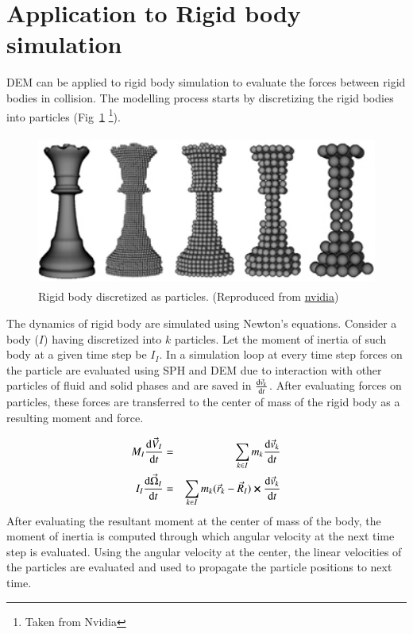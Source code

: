 \section{Application to Rigid body simulation}
\label{sec:appl-rigid-body}

DEM can be applied to rigid body simulation to evaluate the forces between rigid
bodies in collision. The modelling process starts by discretizing the rigid
bodies into particles (Fig~\ref{fig:rigid_body_particles} \footnote{Taken from Nvidia}).


\begin{figure}
  \centering
  \includegraphics[width=0.9\linewidth, height=5cm]{dem/doc_images/grid_to_particles}
  \caption{Rigid body discretized as particles. (Reproduced from
    \href{https://developer.nvidia.com/gpugems/GPUGems3/gpugems3_ch29.html}{nvidia})}
  \label{fig:rigid_body_particles}
\end{figure}


The dynamics of rigid body are simulated using Newton's equations. Consider a
body ($I$) having discretized into $k$ particles. Let the moment of inertia of
such body at a given time step be $I_I$. In a simulation loop at every time step
forces on the particle are evaluated using SPH and DEM due to interaction with
other particles of fluid and solid phases and are saved in $\dv{\vec{v}_k}{t}$.
After evaluating forces on particles, these forces are transferred to the center
of mass of the rigid body as a resulting moment and force.

\begin{eqnarray}
  \label{eq:rigid_body_newton_equation}
  M_I \dv{\vec{V}_I}{t} &=& \sum_{k \in I} m_k \dv{\vec{v}_k}{t}\\
  I_I \dv{\vec{\Omega}_I}{t} &=& \sum_{k \in I} m_k (\vec{r}_k - \vec{R}_I) \cross \dv{\vec{v}_k}{t}
\end{eqnarray}
After evaluating the resultant moment at the center of mass of the body, the
moment of inertia is computed through which angular velocity at the next time
step is evaluated. Using the angular velocity at the center, the linear
velocities of the particles are evaluated and used to propagate the particle
positions to next time.


